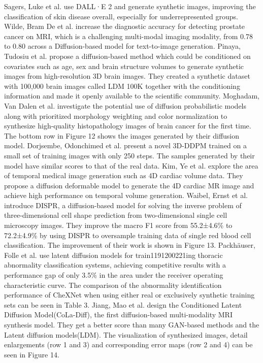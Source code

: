 \documentclass[preprint,12pt,authoryear]{elsarticle}
\begin{document}
Sagers, Luke et al. use DALL·E 2 and generate synthetic images, improving the classification of skin disease overall, especially for underrepresented groups\cite{apl61}. Wilde, Bram De et al. increase the diagnostic accuracy for detecting prostate cancer on MRI, which is a challenging multi-modal imaging modality, from 0.78 to 0.80 across a Diffusion-based model for text-to-image generation\cite{apl62}. Pinaya, Tudosiu et al. propose a diffusion-based method which could be conditioned on covariates such as age, sex and brain structure volumes to generate synthetic images from high-resolution 3D brain images\cite{apl63}. They created a synthetic dataset with 100,000 brain images called LDM 100K together with the conditioning information and made it openly available to the scientific community\cite{apl64}. Moghadam, Van Dalen et al. investigate the potential use of diffusion probabilistic models along with prioritized morphology weighting and color normalization to synthesize high-quality histopathology images of brain cancer for the first time\cite{apl65}. The bottom row in Figure 12 shows the images generated by their diffusion model. Dorjsembe, Odonchimed et al. present a novel 3D-DDPM trained on a small set of training images with only 250 steps\cite{apl80}. The samples generated by their model have similar scores to that of the real data. Kim, Ye et al. explore the area of temporal medical image generation such as 4D cardiac volume data. They propose a diffusion deformable model to generate the 4D cardiac MR image and achieve high performance on temporal volume generation\cite{apl66}. Waibel, Ernst et al. introduce DISPR, a diffusion-based model for solving the inverse problem of three-dimensional cell shape prediction from two-dimensional single cell microscopy images. They improve the macro F1 score from 55.2±4.6\% to 72.2±4.9\% by using DISPR to oversample training data of single red blood cell classification\cite{apl67}. The improvement of their work is shown in Figure 13. Packhäuser, Folle et al. use latent diffusion models for train1191200221ing thoracic abnormality classification systems, achieving competitive results with a performance gap of only 3.5\% in the area under the receiver operating characteristic curve\cite{apl68}. The comparison of the abnormality identification performance of CheXNet when using either real or exclusively synthetic training sets can be seen in Table 3. Jiang, Mao et al. design the Conditioned Latent Diffusion Model(CoLa-Diff), the first diffusion-based multi-modality MRI synthesis model\cite{apl69}. They get a better score than many GAN-based methods and the Latent diffusion models(LDM). The visualization of synthesized images, detail enlargements (row 1 and 3) and corresponding error maps (row 2 and 4) can be seen in Figure 14.
\end{document}
